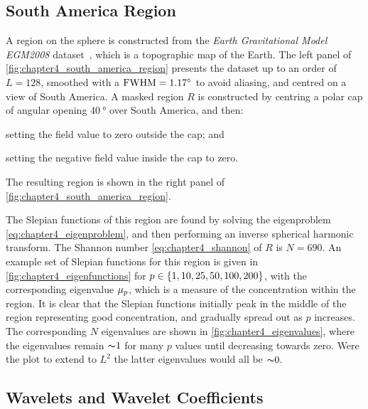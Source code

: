 \subsection{South America Region}\label{sec:chapter4_south_america_region}

A region on the sphere is constructed from the \emph{Earth Gravitational Model EGM2008} dataset~\autocite{Pavlis2013}, which is a topographic map of the Earth.
The left panel of \cref{fig:chapter4_south_america_region} presents the dataset up to an order of \(L=128\), smoothed with a \(\text{FWHM}=\SI{1.17}{\degree}\) to avoid aliasing, and centred on a view of South America.
A masked region \(R\) is constructed by centring a polar cap of angular opening \(\SI{40}{\degree}\) over South America, and then:
%
\begin{inparaenum}[(i)]
	\item setting the field value to zero outside the cap; and
	\item setting the negative field value inside the cap to zero.
\end{inparaenum}
%
The resulting region is shown in the right panel of \cref{fig:chapter4_south_america_region}.



The Slepian functions of this region are found by solving the eigenproblem \cref{eq:chapter4_eigenproblem}, and then performing an inverse spherical harmonic transform.
The Shannon number \cref{eq:chapter4_shannon} of \(R\) is \(N=690\).
An example set of Slepian functions for this region is given in \cref{fig:chapter4_eigenfunctions} for \(p \in \{1, 10, 25, 50, 100, 200\}\), with the corresponding eigenvalue \({\mu}_{p}\), which is a measure of the concentration within the region.
It is clear that the Slepian functions initially peak in the middle of the region representing good concentration, and gradually spread out as \(p\) increases.
The corresponding \(N\) eigenvalues are shown in \cref{fig:chapter4_eigenvalues}, where the eigenvalues remain \({\thicksim}1\) for many \(p\) values until decreasing towards zero.
Were the plot to extend to \(L^{2}\) the latter eigenvalues would all be \({\thicksim}0\).





\subsection{Wavelets and Wavelet Coefficients}\label{sec:chapter4_south_america_wavelets}

